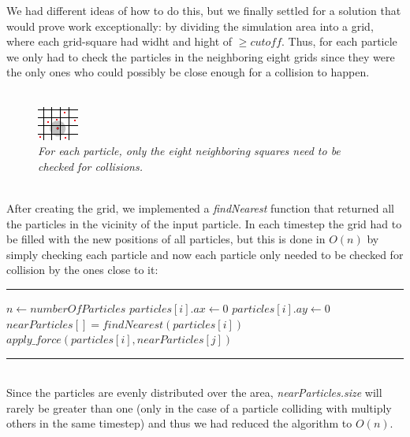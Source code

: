 \documentclass[11pt,a4paper]{article}
\begin{document}
We had different ideas of how to do this, but we finally settled for a solution that would prove work exceptionally: by dividing the simulation area into a grid, where each grid-square had widht and hight of $\geq cutoff$. Thus, for each particle we only had to check the particles in the neighboring eight grids since they were the only ones who could possibly be close enough for a collision to happen.
\\
\\
\begin{figure}[htb]
\centering
\includegraphics[scale=3]{pics/grid.png}
\caption{\emph{For each particle, only the eight neighboring squares need to be checked for collisions.}}
\label{fig:gird}
\end{figure}
\\
After creating the grid, we implemented a \emph{findNearest} function that returned all the particles in the vicinity of the input particle. In each timestep the grid had to be filled with the new positions of all particles, but this is done in $O(n)$ by simply checking each particle and now each particle only needed to be checked for collision by the ones close to it:
\\
\rule{125mm}{0.1pt}
\begin{algorithmic}
\STATE $n \gets numberOfParticles$
	\STATE $particles[i].ax \gets 0$
	\STATE $particles[i].ay \gets 0$
	\STATE $nearParticles[] = findNearest(particles[i])$
			\STATE $apply\_force(particles[i],nearParticles[j])$
	\ENDFOR
\ENDFOR 
\end{algorithmic}
\rule{125mm}{0.1pt}
\vspace{10pt}
\\
Since the particles are evenly distributed over the area, \emph{nearParticles.size} will rarely be greater than one (only in the case of a particle colliding with multiply others in the same timestep) and thus we had reduced the algorithm to $O(n)$.
\end{document}
